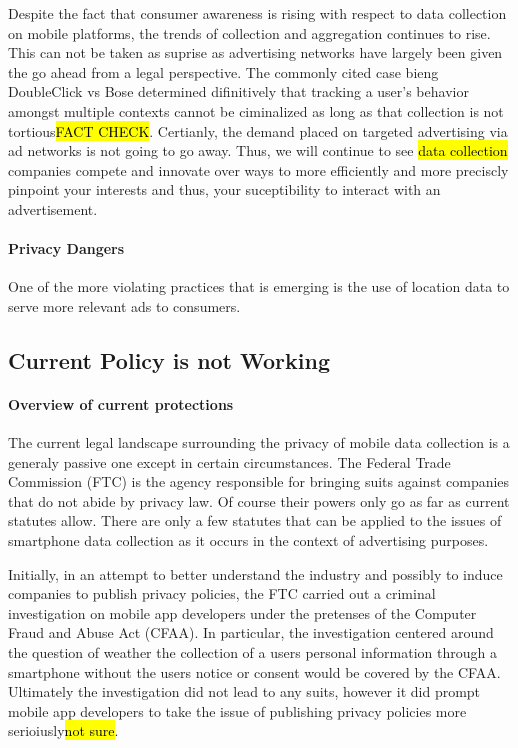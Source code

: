 Despite the fact that consumer awareness is rising with respect to data collection on mobile platforms, the trends of collection and aggregation continues to rise\cite{Source}. This can not be taken as suprise as advertising networks have largely been given the go ahead from a legal perspective. The commonly cited case bieng DoubleClick vs Bose determined difinitively that tracking a user's behavior amongst multiple contexts cannot be ciminalized as long as that collection is not tortious\hl{FACT CHECK}. 
Certianly, the demand placed on targeted advertising via ad networks is not going to go away. Thus, we will continue to see \hl{data collection} companies compete and innovate over ways to more efficiently and more preciscly pinpoint your interests and thus, your suceptibility to interact with an advertisement. 


		\paragraph {Privacy Dangers}

One of the more violating practices that is emerging is the use of location data to serve more relevant ads to consumers. 

	\subsection{Current Policy is not Working}

		\paragraph{Overview of current protections}
The current legal landscape surrounding the privacy of mobile data collection is a generaly passive one except in certain circumstances. The Federal Trade Commission (FTC) is the agency responsible for bringing suits against companies that do not abide by privacy law. Of course their powers only go as far as current statutes allow. There are only a few statutes that can be applied to the issues of smartphone data collection as it occurs in the context of advertising purposes. 

Initially, in an attempt to better understand the industry\cite{wsj2011} and possibly to induce companies to publish privacy policies, the FTC carried out a criminal investigation on mobile app developers under the pretenses of the Computer Fraud and Abuse Act (CFAA). In particular, the investigation centered around the question of weather the collection of a users personal information through a smartphone without the users notice or consent would be covered by the CFAA. Ultimately the investigation did not lead to any suits, however it did prompt mobile app developers to take the issue of publishing privacy policies more serioiusly\hl{not sure}. 


